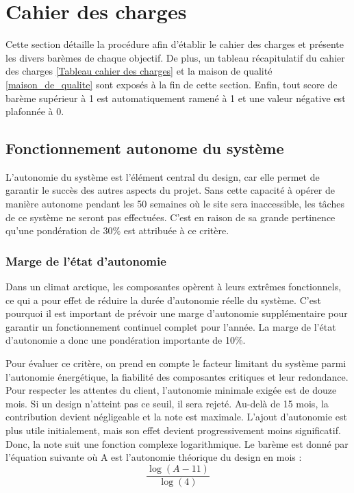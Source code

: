 %
%

\chapter{Cahier des charges}
\label{s:cahier_des_charges}
Cette section détaille la procédure afin d’établir le cahier des charges et présente les divers barèmes de chaque objectif.
De plus, un tableau récapitulatif du cahier des charges \ref{Tableau cahier des charges} et la maison de qualité \ref{maison_de_qualite} sont exposés à la fin de cette section.
Enfin, tout score de barème supérieur à 1 est automatiquement ramené à 1 et une valeur négative est plafonnée à 0.

\section{Fonctionnement autonome du système}
\label{Autonomie}
L’autonomie du système est l’élément central du design, car elle permet de garantir le succès des autres aspects du projet. Sans cette capacité à opérer de manière autonome pendant les 50 semaines où le site sera inaccessible, les tâches de ce système ne seront pas effectuées. C’est en raison de sa grande pertinence qu’une pondération de 30\% est attribuée à ce critère.

\subsection{Marge de l'état d'autonomie}
\label{robutesse_autonomie}
Dans un climat arctique, les composantes opèrent à leurs extrêmes fonctionnels, ce qui a pour effet de réduire la durée d’autonomie réelle du système.
C’est pourquoi il est important de prévoir une marge d’autonomie supplémentaire pour garantir un fonctionnement continuel complet pour l’année.
La marge de l’état d’autonomie a donc une pondération importante de 10\%. 
\bigskip

Pour évaluer ce critère, on prend en compte le facteur limitant du système parmi l’autonomie énergétique, la fiabilité des composantes critiques et leur redondance.
Pour respecter les attentes du client, l’autonomie minimale exigée est de douze mois. 
Si un design n’atteint pas ce seuil, il sera rejeté.
Au-delà de 15 mois, la contribution devient négligeable et la note est maximale.
L’ajout d’autonomie est plus utile initialement, mais son effet devient progressivement moins significatif. Donc, la note suit une fonction complexe logarithmique.
Le barème est donné par l’équation suivante où A est l’autonomie théorique du design en mois :
\begin{equation}
    \frac{\log(A-11)}{\log(4)}
\end{equation}

